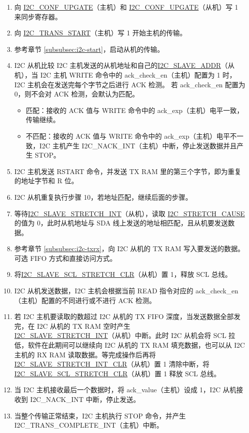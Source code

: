 \documentclass[main\_\_CN.tex]{subfiles}
\begin{document}
\begin{enumerate}
\item 向 \hyperref[fielddesc:I2CCONFUPGATE]{I2C\_CONF\_UPGATE}（主机）和 \hyperref[fielddesc:I2CCONFUPGATE]{I2C\_CONF\_UPGATE}（从机）写 1 来同步寄存器。
\item 向 \hyperref[fielddesc:I2CTRANSSTART]{I2C\_TRANS\_START}（主机）写 1 开始主机的传输。
\item 参考章节 \ref{subsubsec:i2c-start}，启动从机的传输。
\item I2C 从机比较 I2C 主机发送的从机地址和自己的\hyperref[fielddesc:I2CSLAVEADDR]{I2C\_SLAVE\_ADDR}（从机），当 I2C 主机 WRITE 命令中的 ack\_check\_en（主机）配置为 1 时，I2C 主机会在发送完每个字节之后进行 ACK 检测。 若 ack\_check\_en 配置为 0，则不会对 ACK 检测，会默认为匹配。
\begin{itemize}
\item 匹配：接收的 ACK 值与 WRITE 命令中的 ack\_exp（主机）电平一致，传输继续。
\item 不匹配：接收的 ACK 值与 WRITE 命令中的 ack\_exp（主机）电平不一致，I2C 主机产生 I2C\_NACK\_INT（主机）中断，停止发送数据并且产生 STOP。
\end{itemize}

\item I2C 主机发送 RSTART 命令，并发送 TX RAM 里的第三个字节，即为重复的地址字节和 R 位。
\item I2C 从机重复执行步骤 10，若地址匹配，继续后面的步骤。


\item 等待\hyperref[int:i2c-slave-stretch]{I2C\_SLAVE\_STRETCH\_INT}（从机），读取 \hyperref[fielddesc:I2CSTRETCHCAUSE]{I2C\_STRETCH\_CAUSE} 的值为 0，此时从机地址与 SDA 线上发送的地址相匹配，且从机要发送数据。
\item 参考章节 \ref{subsubsec:i2c-txrx}，向 I2C 从机的 TX RAM 写入要发送的数据。可选 FIFO 方式和直接访问方式。
\item 将\hyperref[fielddesc:I2CSLAVESCLSTRETCHCLR]{I2C\_SLAVE\_SCL\_STRETCH\_CLR}（从机）置 1，释放 SCL 总线。


\item I2C 从机发送数据，I2C 主机会根据当前 READ 指令对应的 ack\_check\_en（主机）配置的不同进行或不进行 ACK 检测。
\item 若 I2C 主机要读取的数超过 I2C 从机的 TX FIFO 深度，当发送数据全部发完，在 I2C 从机的 TX RAM 空时产生 \\\hyperref[int:i2c-slave-stretch]{I2C\_SLAVE\_STRETCH\_INT}（从机）中断。此时 I2C 从机会将 SCL 拉低，软件在此期间可以继续向 I2C 从机的 TX RAM 填充数据，也可以从 I2C 主机的 RX RAM 读取数据。等完成操作后再将 \hyperref[fielddesc:I2CSLAVESTRETCHINTCLR]{I2C\_SLAVE\_STRETCH\_INT\_CLR}（从机）置 1 清除中断，将\hyperref[fielddesc:I2CSLAVESCLSTRETCHCLR]{I2C\_SLAVE\_SCL\_STRETCH\_CLR}（从机）置 1 释放 SCL 总线。

\item 当 I2C 主机接收最后一个数据时，将 ack\_value（主机）设成 1，I2C 从机接收到 I2C\_NACK\_INT 中断，停止发送。

\item 当整个传输正常结束，I2C 主机执行 STOP 命令，并产生 I2C\_TRANS\_COMPLETE\_INT（主机）中断。
\end{enumerate}
\end{document}

